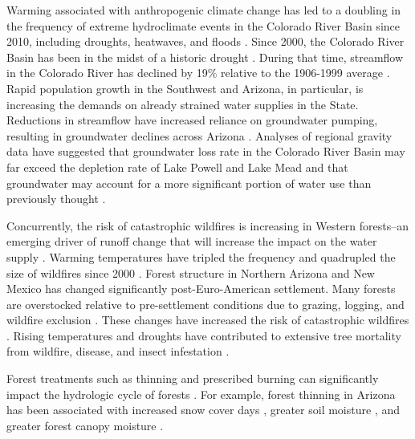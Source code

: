 \documentclass[
  number,
  preprint,
  3p,
  onecolumn]{elsarticle}
\begin{document}
Warming associated with anthropogenic climate change has led to a
doubling in the frequency of extreme hydroclimate events in the Colorado
River Basin since 2010, including droughts, heatwaves, and floods
\citep{bennett_concurrent_2021}. Since 2000, the Colorado River Basin
has been in the midst of a historic drought
\citep{meko_treering_2022, williams_rapid_2022}. During that time,
streamflow in the Colorado River has declined by 19\% relative to the
1906-1999 average \citep{hogan_recent_2024, udall_twentyfirst_2017}.
Rapid population growth in the Southwest and Arizona, in particular, is
increasing the demands on already strained water supplies in the State.
Reductions in streamflow have increased reliance on groundwater pumping,
resulting in groundwater declines across Arizona
\citep{tadych_historical_2024}. Analyses of regional gravity data have
suggested that groundwater loss rate in the Colorado River Basin may far
exceed the depletion rate of Lake Powell and Lake Mead and that
groundwater may account for a more significant portion of water use than
previously thought \citep{castle2014}.

Concurrently, the risk of catastrophic wildfires is increasing in
Western forests--an emerging driver of runoff change that will increase
the impact on the water supply \citep{williams_rapid_2022}. Warming
temperatures have tripled the frequency and quadrupled the size of
wildfires since 2000 \citep{iglesias2022}. Forest structure in Northern
Arizona and New Mexico has changed significantly post-Euro-American
settlement. Many forests are overstocked relative to pre-settlement
conditions due to grazing, logging, and wildfire exclusion
\citep{covington_southwestern_1994, friederici2013}. These changes have
increased the risk of catastrophic wildfires
\citep{allen_ecological_2002}. Rising temperatures and droughts have
contributed to extensive tree mortality from wildfire, disease, and
insect infestation \citep{berner_tree_2017}.

Forest treatments such as thinning and prescribed burning can
significantly impact the hydrologic cycle of forests
\citep{del_campo_global_2022}. For example, forest thinning in Arizona
has been associated with increased snow cover days
\citep{sankey_multi-scale_2015, belmonte_uav-based_2021, donager_integrating_2021},
greater soil moisture \citep{belmonte_soil_2022, sankey_thinning_2022},
and greater forest canopy moisture \citep{sankey_regionalscale_2021}.
\end{document}
